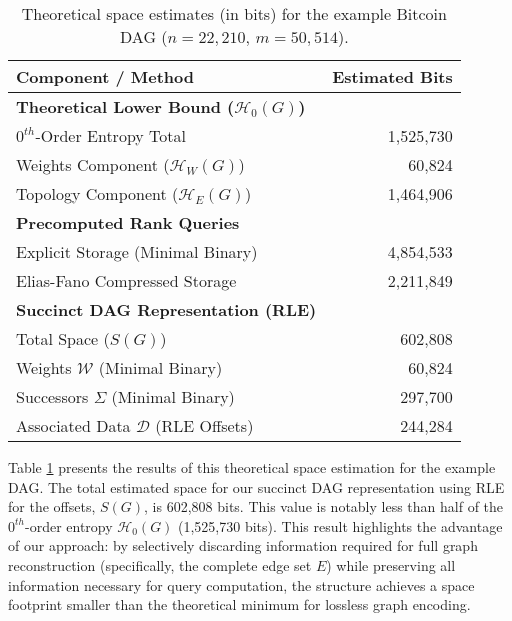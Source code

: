 \begin{table}[htbp]
    \centering
    \small
    \begin{tabular}{l r}
        \toprule
        Component / Method                                      & Estimated Bits \\
        \midrule
        \textbf{Theoretical Lower Bound ($\mathcal{H}_0(G)$)}   &                \\
        \quad $0^{th}$-Order Entropy Total                      & 1,525,730      \\
        \quad \quad Weights Component ($\mathcal{H}_W(G)$)      & 60,824         \\
        \quad \quad Topology Component ($\mathcal{H}_E(G)$)     & 1,464,906      \\
        \midrule
        \textbf{Precomputed Rank Queries}                       &                \\
        \quad Explicit Storage (Minimal Binary)                 & 4,854,533      \\
        \quad Elias-Fano Compressed Storage                     & 2,211,849      \\
        \midrule
        \textbf{Succinct DAG Representation (RLE)}              &                \\
        \quad Total Space ($S(G)$)                              & 602,808        \\
        \quad \quad Weights $\mathcal{W}$ (Minimal Binary)      & 60,824         \\
        \quad \quad Successors $\Sigma$ (Minimal Binary)        & 297,700        \\
        \quad \quad Associated Data $\mathcal{D}$ (RLE Offsets) & 244,284        \\
        \bottomrule
    \end{tabular}
    \caption{Theoretical space estimates (in bits) for the example Bitcoin DAG ($n=22,210$, $m=50,514$).}
    \label{tab:space_estimates_bitcoin}
\end{table}

Table \ref{tab:space_estimates_bitcoin} presents the results of this theoretical space estimation for the example DAG. The total estimated space for our succinct DAG representation using RLE for the offsets, $S(G)$, is 602,808 bits. This value is notably less than half of the $0^{th}$-order entropy $\mathcal{H}_0(G)$ (1,525,730 bits). This result highlights the advantage of our approach: by selectively discarding information required for full graph reconstruction (specifically, the complete edge set $E$) while preserving all information necessary for \Rank{} query computation, the structure achieves a space footprint smaller than the theoretical minimum for lossless graph encoding.

